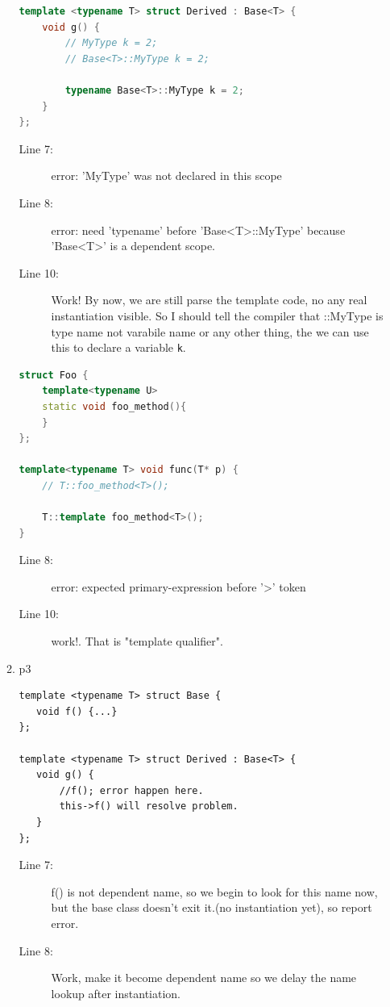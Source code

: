 \documentclass[a4paper,11pt,twoside]{book}
\begin{document}
\begin{itemize}
\begin{enumerate}
\begin{lstlisting}[frame=single, language=c++]
template <typename T> struct Derived : Base<T> {
	void g() {
		// MyType k = 2;
		// Base<T>::MyType k = 2;
		
		typename Base<T>::MyType k = 2;
	}
};
\end{lstlisting}
\begin{description}
	\item[Line 7:]  error: 'MyType' was not declared in this scope
	
	\item[Line 8:] error: need 'typename' before 'Base<T>::MyType' because 'Base<T>' is a dependent scope.
	
	\item[Line 10:] Work! By now, we are still parse the template code, no any real instantiation visible. So I should tell the compiler that ::MyType is type name not varabile name or any other thing, the we can use this to declare a variable \texttt{k}.
\end{description}

\begin{lstlisting}[frame=single, language=c++]
struct Foo {
	template<typename U>
	static void foo_method(){
	}
};

template<typename T> void func(T* p) {
	// T::foo_method<T>();
	
	T::template foo_method<T>();
}
\end{lstlisting}
\begin{description}
	\item[Line 8:] error: expected primary-expression before '>' token
	\item[Line 10:] work!. That is "template qualifier".
\end{description}

\item p3
\begin{lstlisting}[]
template <typename T> struct Base {
   void f() {...}
};

template <typename T> struct Derived : Base<T> {
   void g() {
       //f(); error happen here. 
       this->f() will resolve problem.
   }
};
\end{lstlisting}
\begin{description}
	\item[Line 7:] f() is not dependent name, so we begin to look for this name now, but the base class doesn't exit it.(no instantiation yet), so report error.
	
	\item[Line 8:] Work, make it become dependent name so we delay the name lookup after instantiation.
\end{description}



\end{enumerate}
\end{itemize}
\end{document}

